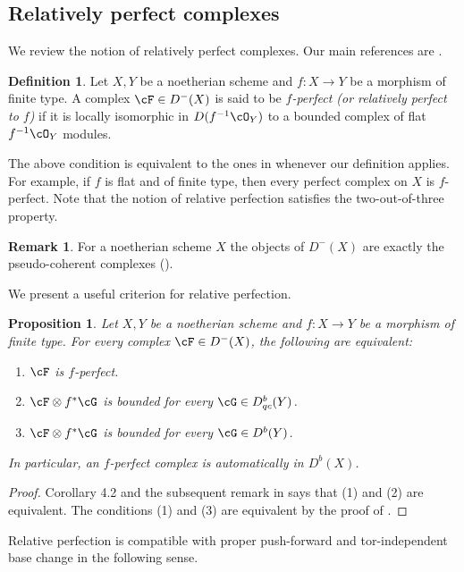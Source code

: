 \documentclass[12pt]{amsart}
\numberwithin{equation}{section}
\theoremstyle{plain}
\newtheorem{proposition}[theorem]{Proposition}
\theoremstyle{definition}
\newtheorem{definition}[theorem]{Definition}
\newtheorem{remark}[theorem]{Remark}
\begin{document}
\subsection{Relatively perfect complexes}
We review the notion of relatively perfect complexes.
Our main references are \cite{10.1007/BFb0066287, MR3720794, MR4604981, stacks-project}.
\begin{definition}
    Let $X, Y$ be a noetherian scheme and $f \colon X \to Y$ be a morphism of finite type.
    A complex $\cF \in D^-(X)$ is said to be \emph{$f$-perfect (or relatively perfect to $f$)} if it is locally isomorphic in $D(f^{-1}\cO_Y)$ to a bounded complex of flat $f^{-1}\cO_Y$ modules.
\end{definition}
The above condition is equivalent to the ones in \cite{10.1007/BFb0066287, MR3720794, MR4604981} whenever our definition applies.
For example, if $f$ is flat and of finite type, then every perfect complex on $X$ is $f$-perfect.
Note that the notion of relative perfection satisfies the two-out-of-three property.
\begin{remark}
    For a noetherian scheme $X$ the objects of $D^{-}(X)$ are exactly the pseudo-coherent complexes (\cite[\href{https://stacks.math.columbia.edu/tag/08E8}{Tag 08E8}]{stacks-project}).
\end{remark}
We present a useful criterion for relative perfection.
\begin{proposition}\label{prop:crirtion_for_relative_perfection}
    Let $X, Y$ be a noetherian scheme and $f \colon X \to Y$ be a morphism of finite type.
    For every complex $\cF \in D^{-}(X)$, the following are equivalent:
    \begin{enumerate}
        \item $\cF$ is $f$-perfect.
        \item $\cF \otimes f^*\cG$ is bounded for every $\cG \in D_{qc}^b(Y)$.
        \item $\cF \otimes f^*\cG$ is bounded for every $\cG \in D^b(Y)$.
    \end{enumerate}
    In particular, an $f$-perfect complex is automatically in $D^b(X)$.
\end{proposition}
\begin{proof}
    Corollary 4.2 and the subsequent remark in \cite{MR4604981} says that (1) and (2) are equivalent.
    The conditions (1) and (3) are equivalent by the proof of \cite[Lemma 5.1]{MR3720794}.
\end{proof}
Relative perfection is compatible with proper push-forward and tor-independent base change in the following sense.
\end{document}
